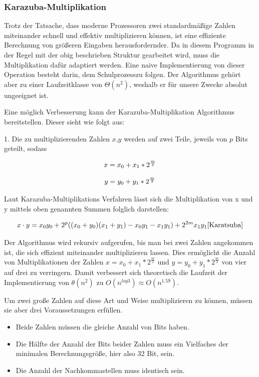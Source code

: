 \documentclass[course=erap]{aspdoc}
\begin{document}
	\subsubsection{Karazuba-Multiplikation}
	Trotz der Tatsache, dass moderne Prozessoren zwei standardmäßige Zahlen miteinander schnell und effektiv multiplizieren können, ist eine effiziente Berechnung von größeren Eingaben herausfordernder. Da in diesem Programm in der Regel mit der obig beschrieben Struktur gearbeitet wird, muss die Multiplikation dafür adaptiert werden.\newline
	Eine naive Implementierung von dieser Operation besteht darin, dem \glqq Schulprozess\grqq zu folgen. Der Algorithmus gehört aber zu einer Laufzeitklasse von $\Theta(n^2)$, weshalb er für unsere Zwecke absolut ungeeignet ist.
	
	Eine möglich Verbesserung kann der Karazuba-Multiplikation Algorithmus bereitstellen. Dieser sieht wie folgt aus:
	
	1. Die zu multiplizierenden Zahlen $x$,$y$ werden auf zwei Teile, jeweils von $p$ Bits geteilt, sodass
	
	\begin{equation*}
		\centering
		x = x_0 + x_1*2^{\frac{m}{2}}
	\end{equation*}
	
	
	\begin{equation*}
		\centering
		y = y_0 + y_1*2^{\frac{m}{2}}
	\end{equation*}
	
	Laut Karazuba-Multiplikations Verfahren lässt sich die Multiplikation von x und y mittels oben genannten Summen folglich darstellen:
	
	\begin{equation*}
		x\cdot y= x_0y_0 + 2^p((x_0+y_0)(x_1+y_1) - x_0y_1 - x_1y_1) + 2^{2m}x_1y_1    
		\cite{Karatsuba} 	
	\end{equation*}
	
	Der Algorithmus wird rekursiv aufgerufen, bis man bei zwei Zahlen angekommen ist, die sich effizient miteinander multiplizieren lassen.
	Dies ermöglicht die Anzahl von Multiplikationen der Zahlen $x = x_0 + x_1*2^{\frac{m}{2}}$ und $y = y_0 + y_1*2^{\frac{m}{2}}$ von vier auf drei zu verringern.  Damit verbessert sich theoretisch die Laufzeit der Implementierung von $\theta(n^2)$ zu 
	$O(n^{log 3}) \approx O(n^{1.59})$. \newline
	
	Um zwei große Zahlen auf diese Art und Weise multiplizieren zu können, müssen sie aber drei Voraussetzungen erfüllen. 
	\begin{itemize}
		\item Beide Zahlen müssen die gleiche Anzahl von Bits haben. 
		\item Die Hälfte der Anzahl der Bits beider Zahlen muss ein Vielfaches der minimalen Berechnungsgröße, hier also 32 Bit, sein.
		\item Die Anzahl der Nachkommastellen muss identisch sein.
	\end{itemize}
	
\end{document}
